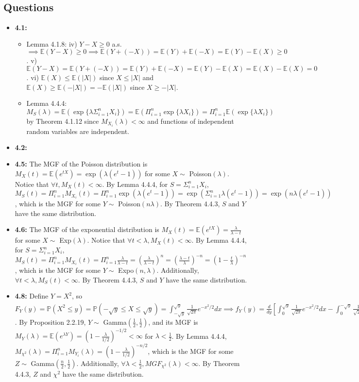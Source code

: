 \documentclass[12pt]{article}
\newcommand{\E}{\mathbb{E}}
\newcommand{\p}{\mathbb{P}}
\begin{document}
\subsection*{Questions}
\begin{itemize}
    \item \textbf{4.1:}
    \begin{itemize}
        \item Lemma 4.1.8: iv) $Y - X \geq 0$ a.s. $\implies \E(Y - X) \geq 0 \implies \E(Y + (-X)) = \E(Y) + \E(-X) = \E(Y) - \E(X) \geq 0$. v) $\E(Y - X) = \E(Y + (-X)) = \E(Y) + \E(-X) = \E(Y) - \E(X) = \E(X) - \E(X) = 0$. vi) $\E(X) \leq \E(|X|)$ since $X \leq |X|$ and $\E(X) \geq \E(-|X|) = -\E(|X|)$ since $X \geq -|X|$.
        \item Lemma 4.4.4: $M_S(\lambda) = \E(\exp\{\lambda \Sigma_{i=1}^n X_i\}) = \E(\Pi_{i=1}^n \exp\{\lambda X_i\}) = \Pi_{i=1}^n \E(\exp\{\lambda X_i\})$ by Theorem 4.1.12 since $M_{X_i}(\lambda) < \infty$ and functions of independent random variables are independent.
    \end{itemize}
    \item \textbf{4.2:}
    \item \textbf{4.5:} The MGF of the Poisson distribution is $M_{X}(t) = \E(e^{tX}) = \exp(\lambda(e^t - 1))$ for some $X \sim$ Poisson$(\lambda)$. Notice that $\forall t, M_{X}(t) < \infty$. By Lemma 4.4.4, for $S = \Sigma_{i=1}^n X_i$, $M_S(t) = \Pi_{i=1}^n M_{X_i}(t) = \Pi_{i=1}^n \exp(\lambda(e^t - 1)) = \exp(\Sigma_{i=1}^n \lambda(e^t - 1)) = \exp(n\lambda(e^t - 1))$, which is the MGF for some $Y \sim$ Poisson$(n\lambda)$. By Theorem 4.4.3, $S$ and $Y$ have the same distribution.
    \item \textbf{4.6:} The MGF of the exponential distribution is $M_{X}(t) = \E(e^{tX}) = \frac{\lambda}{\lambda - t}$ for some $X \sim$ Exp$(\lambda)$. Notice that $\forall t < \lambda, M_{X}(t) < \infty$. By Lemma 4.4.4, for $S = \Sigma_{i=1}^n X_i$, $M_S(t) = \Pi_{i=1}^n M_{X_i}(t) = \Pi_{i=1}^n \frac{\lambda}{\lambda - t} = (\frac{\lambda}{\lambda - t})^n = (\frac{\lambda - t}{\lambda})^{-n} = (1 - \frac{t}{\lambda})^{-n}$, which is the MGF for some $Y \sim$ Expo$(n, \lambda)$. Additionally, $\forall t < \lambda, M_{S}(t) < \infty$. By Theorem 4.4.3, $S$ and $Y$ have the same distribution.
    \item \textbf{4.8:} Define $Y = X^2$, so $F_Y(y) = \p(X^2 \leq y) = \p(-\sqrt{y} \leq X \leq \sqrt{y}) = \int_{-\sqrt{y}}^{\sqrt{y}} \frac{1}{\sqrt{2\pi}} e^{-x^2/2}dx \implies f_Y(y) = \frac{d}{dy} [\int_0^{\sqrt{y}} \frac{1}{\sqrt{2\pi}} e^{-x^2/2}dx - \int_0^{-\sqrt{y}} \frac{1}{\sqrt{2\pi}} e^{-x^2/2}dx] = \frac{1}{\sqrt{2\pi y}} e^{-y/2} = \frac{(1/2)^{1/2}}{\Gamma(1/2)} y^{(1/2)-1} e^{-(1/2)y}$. By Proposition 2.2.19, $Y \sim$ Gamma$(\frac{1}{2}, \frac{1}{2})$, and its MGF is $M_Y(\lambda) = \E(e^{\lambda Y}) = (1 - \frac{\lambda}{1/2})^{-1/2} < \infty$ for $\lambda < \frac{1}{2}$. By Lemma 4.4.4, $M_{\chi^2}(\lambda) = \Pi_{i=1}^n M_{Y_i}(\lambda) = (1 - \frac{\lambda}{1/2})^{-n/2}$, which is the MGF for some $Z \sim$ Gamma$(\frac{n}{2}, \frac{1}{2})$. Additionally, $\forall \lambda < \frac{1}{2}, MGF_{\chi^2}(\lambda) < \infty$. By Theorem 4.4.3, $Z$ and $\chi^2$ have the same distribution.

\end{itemize}
\end{document}
